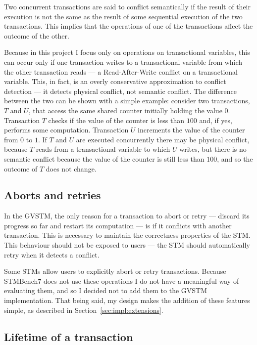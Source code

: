 \documentclass[12pt,a4paper,oneside,openright]{report}
\begin{document}
Two concurrent transactions are said to conflict semantically if the
result of their execution is not the same as the result of some
sequential execution of the two transactions. This implies that the
operations of one of the transactions affect the outcome of the other.

Because in this project I focus only on operations on transactional
variables, this can occur only if one transaction writes to a
transactional variable from which the other transaction reads --- a
Read-After-Write conflict on a transactional variable. This, in fact,
is an overly conservative approximation to conflict detection --- it
detects physical conflict, not semantic conflict. The difference
between the two can be shown with a simple example: consider two
transactions, $T$ and $U$, that access the same shared counter
initially holding the value $0$. Transaction $T$ checks if the value
of the counter is less than $100$ and, if yes, performs some
computation. Transaction $U$ increments the value of the counter from
$0$ to $1$. If $T$ and $U$ are executed concurrently there may be
physical conflict, because $T$ reads from a transactional variable to
which $U$ writes, but there is no semantic conflict because the value
of the counter is still less than $100$, and so the outcome of $T$
does not change.

\subsection{Aborts and retries}
\label{sec:aborts-using-panics}

In the GVSTM, the only reason for a transaction to abort or retry ---
discard its progress so far and restart its computation --- is if it
conflicts with another transaction. This is necessary to maintain the
correctness properties of the STM. This behaviour should not be
exposed to users --- the STM should automatically retry when it
detects a conflict.

Some STMs allow users to explicitly abort or retry
transactions. Because STMBench7 does not use these operations I do not
have a meaningful way of evaluating them, and so I decided not to add
them to the GVSTM implementation. That being said, my design makes the
addition of these features simple, as described in
Section~\ref{sec:impl:extensions}.

\subsection{Lifetime of a transaction}
\label{sec:lifetime-transaction}
\end{document}
